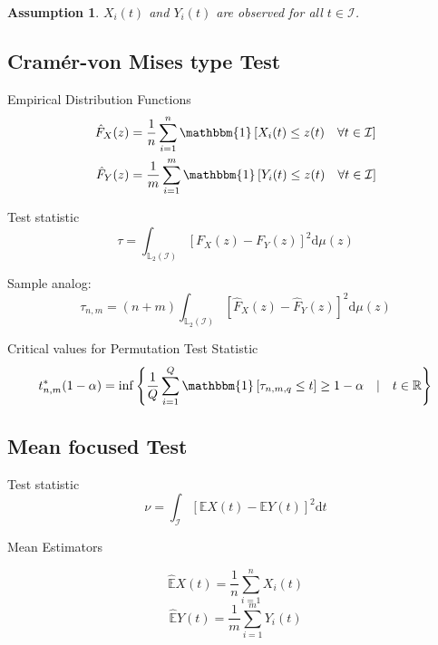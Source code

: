 \documentclass[11pt,twoside,a4paper]{article}
\theoremstyle{assumpstyle} \newtheorem{assumption}{Assumption}
\theoremstyle{assumpstyle} \newtheorem{definition}{Definition}
\begin{document}
			\begin{assumption}
				$X_i(t)$ and $Y_i(t)$ are observed for all $t \in \mathcal{I}$.
			\end{assumption}
	
		
			
		
		\subsection{Cram\'{e}r-von Mises type Test}
		
			Empirical Distribution Functions
			\begin{equation}
				\begin{split}
					\hat{F}_X(z) &= \frac{1}{n} \sum_{i = 1}^{n}\mathbbm{1}\left[X_i(t) \leq z(t) \quad \forall t \in \mathcal{I}\right] \\
					\hat{F}_Y(z) &= \frac{1}{m} \sum_{i = 1}^{m}\mathbbm{1}\left[Y_i(t) \leq z(t) \quad \forall t \in \mathcal{I}\right]
				\end{split}
			\end{equation}
			
			Test statistic
			\begin{equation}
				\tau = \int_{\mathbb{L}_2(\mathcal{I})}\left[F_X(z) - F_Y(z)\right]^2 \mathrm{d} \mu(z)
			\end{equation}
			
			Sample analog:
			\begin{equation}
				\tau_{n,m} = (n+m) \int_{\mathbb{L}_2(\mathcal{I})}\left[\hat{F}_X(z) - \hat{F}_Y(z)\right]^2 \mathrm{d} \mu(z)
			\end{equation}
		
			Critical values for Permutation Test Statistic
			\begin{equation}
				t^{*}_{n,m}(1-\alpha) = \inf \left\{\frac{1}{Q} \sum_{i = 1}^{Q} \mathbbm{1}\left[\tau_{n,m,q} \leq t\right] \geq 1 - \alpha \quad \vert \quad t \in \mathbb{R}\right\}
			\end{equation}
		
		\subsection{Mean focused Test}
			
			Test statistic
			\begin{equation}
				\nu = \int_{\mathcal{I}} \left[\mathbb{E}X(t) - \mathbb{E}Y(t)\right]^2 \mathrm{d}t
			\end{equation}
		
			Mean Estimators
			\begin{multicols}{2}
				\noindent
				\begin{equation}
					\hat{\mathbb{E}}X(t) = \frac{1}{n}\sum_{i = 1}^{n} X_i(t)
				\end{equation}
				\begin{equation}
					\hat{\mathbb{E}}Y(t) = \frac{1}{m}\sum_{i = 1}^{m} Y_i(t)
				\end{equation}
			\end{multicols}
			
\end{document}
